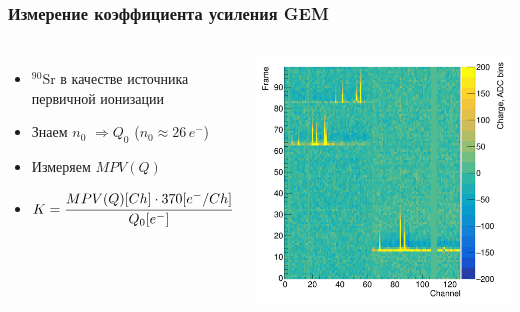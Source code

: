 \documentclass[14pt]{beamer}
\begin{document}
\begin{frame}[c]
\frametitle{Измерение коэффициента усиления GEM}
\vspace{0pt}
\begin{columns}
\vspace{10pt}
\begin{minipage}[t][1\textheight]{\linewidth}
\small{\begin{itemize}
		\item $\mathrm{^{90}Sr}$ в качестве источника первичной ионизации
		\item Знаем  $n_{0}$ $\Rightarrow Q_{0}$ ($n_{0} \approx 26\,e^-$)
		\item Измеряем $ MPV(Q)$
		\item $K = \cfrac{ MPV(Q)[Ch] \cdot 370 [e^-/Ch]}{Q_0[e^-]}$
\end{itemize}}
\end{minipage}%
\vspace{10pt}
\begin{minipage}[t][1\textheight]{\linewidth}
\center \includegraphics[width=1\textwidth]{Signal.png}

\end{minipage}%
\end{columns}
\end{frame}
\end{document}
